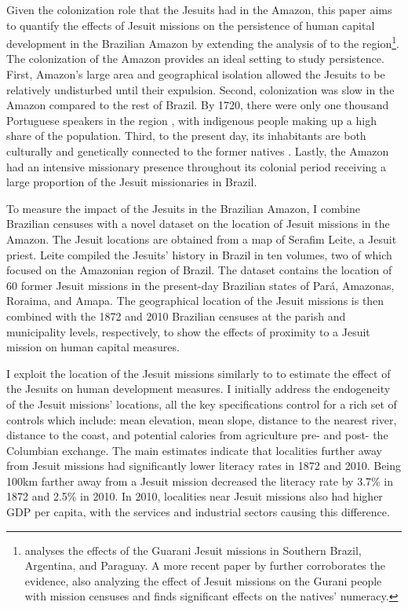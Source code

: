 \documentclass{article}
\begin{document}
Given the colonization role that the Jesuits had in the Amazon, this paper aims to quantify the effects of Jesuit missions on the persistence of human capital development in the Brazilian Amazon by extending the analysis of \textcite{Valencia_Caicedo2018-gp} to the region\footnote{
  \textcite{Valencia_Caicedo2018-gp} analyses the effects of the Guarani Jesuit missions in Southern Brazil, Argentina, and Paraguay. A more recent paper by \textcite{Gomez-i-Aznar2022-pt} further corroborates the evidence, also analyzing the effect of Jesuit missions on the Gurani people with mission censuses and finds significant effects on the natives' numeracy.}. 
The colonization of the Amazon provides an ideal setting to study persistence. 
First, Amazon's large area and geographical isolation allowed the Jesuits to be relatively undisturbed until their expulsion. 
Second, colonization was slow in the Amazon compared to the rest of Brazil. 
By 1720, there were only one thousand Portuguese speakers in the region \parencite{Mufwene2014-gx}, with indigenous people making up a high share of the population. 
Third, to the present day, its inhabitants are both culturally and genetically connected to the former natives \parencites[p.~50]{Arenz2012-cc}{Parker1989-ul}{Souza2019-lr}. 
Lastly, the Amazon had an intensive missionary presence throughout its colonial period receiving a large proportion of the Jesuit missionaries in Brazil. 

To measure the impact of the Jesuits in the Brazilian Amazon, I combine Brazilian censuses with a novel dataset on the location of Jesuit missions in the Amazon.
The Jesuit locations are obtained from a map of Serafim Leite, a Jesuit priest.
Leite compiled the Jesuits' history in Brazil in ten volumes, two of which focused on the Amazonian region of Brazil.
The dataset contains the location of 60 former Jesuit missions in the present-day Brazilian states of Pará, Amazonas, Roraima, and Amapa. 
The geographical location of the Jesuit missions is then combined with the 1872 and 2010 Brazilian censuses at the parish and municipality levels, respectively, to show the effects of proximity to a Jesuit mission on human capital measures.

I exploit the location of the Jesuit missions similarly to \textcite{Valencia_Caicedo2018-gp} to estimate the effect of the Jesuits on human development measures. 
I initially address the endogeneity of the Jesuit missions' locations, all the key specifications control for a rich set of controls which include: mean elevation, mean slope, distance to the nearest river, distance to the coast, and potential calories from agriculture pre- and post- the Columbian exchange. 
The main estimates indicate that localities further away from Jesuit missions had significantly lower literacy rates in 1872 and 2010. Being 100km farther away from a Jesuit mission decreased the literacy rate by 3.7\% in 1872 and 2.5\% in 2010. 
In 2010, localities near Jesuit missions also had higher GDP per capita, with the services and industrial sectors causing this difference. 
\end{document}
